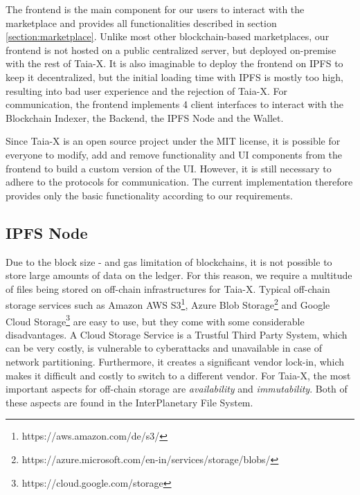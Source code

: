The frontend is the main component for our users to interact with the marketplace and provides all functionalities described in section \ref{section:marketplace}. Unlike most other blockchain-based marketplaces, our frontend is not hosted on a public centralized server, but deployed on-premise with the rest of Taia-X. It is also imaginable to deploy the frontend on IPFS to keep it decentralized, but the initial loading time with IPFS is mostly too high, resulting into bad user experience and the rejection of Taia-X. For communication, the frontend implements 4 client interfaces to interact with the Blockchain Indexer, the Backend, the IPFS Node and the Wallet.
            
Since Taia-X is an open source project under the MIT license, it is possible for everyone to modify, add and remove functionality and UI components from the frontend to build a custom version of the UI. However, it is still necessary to adhere to the protocols for communication. The current implementation therefore provides only the basic functionality according to our requirements.
            
\subsection{IPFS Node}

Due to the block size - and gas limitation of blockchains, it is not possible to store large amounts of data on the ledger. For this reason, we require a multitude of files being stored on off-chain infrastructures for Taia-X. Typical off-chain storage services such as Amazon AWS S3\footnote{https://aws.amazon.com/de/s3/}, Azure Blob Storage\footnote{https://azure.microsoft.com/en-in/services/storage/blobs/} and Google Cloud Storage\footnote{https://cloud.google.com/storage} are easy to use, but they come with some considerable disadvantages. A Cloud Storage Service is a Trustful Third Party System, which can be very costly, is vulnerable to cyberattacks and unavailable in case of network partitioning. Furthermore, it creates a significant vendor lock-in, which makes it difficult and costly to switch to a different vendor. For Taia-X, the most important aspects for off-chain storage are \emph{availability} and \emph{immutability}. Both of these aspects are found in the InterPlanetary File System.

